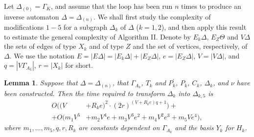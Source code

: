 \documentclass[a4paper,12pt]{article}
\newcommand{\G}{\Gamma }
\newcommand{\D}{\Delta }
\newcommand{\T}{\Theta }
\newtheorem{lemma}[theorem]{Lemma}
\numberwithin{equation}{section}
\numberwithin{figure}{section}
\begin{document}
Let $\D_{(0)} = \G_K$,
 and assume that the loop has been run $n$ times to produce an
inverse automaton $\D=\D_{(n)}$.
We shall
first study  the complexity of modifications $1 - 5$ for a subgraph $\D_k$ of $\D$ ($k=1,2$), and then apply this result
to estimate the general complexity of Algorithm II. Denote by $E_k
\D$, $E_Z \T$ and $V\D$ the sets of edges of type $X_k$ and of
type $Z$ and the set of vertices, respectively, of  $\D$.
 We use the notation $E = |E \D| =
|E_k \D| + |E_Z \D|$, $e = |E_Z \D|$, $V = |V \D|$, and $q = |V
\G_{A_k}|$, $r = |X_k|$ for short.


\begin{lemma}\label{lem:resolution} Suppose that $\D = \D_{(n)}$,
that $\G_{A_k}$, $T_k$ and $P_k^\prime$, $P_k$,  $C_k$, $\D_k$, and $\nu$  have been
constructed. Then the time required to transform $\D_k$ into $\D_{k,5}$ is
\[\begin{split}
O((V &+R_k e)^2\cdot (2r)^{(V + R_k e) q +1})+\\
+O(m_1 V^5 &+ m_2V^4 e +m_3 V^3 e^2 +m_4 V^2 e^3 + m_5 V e^4),
\end{split}
\]
where $m_1, \ldots, m_5, q, r,  R_k $ are constants dependent on
$\G_{A_k}$ and the basis $Y_k$ for $H_k$.

%



%

\end{lemma}
\end{document}
